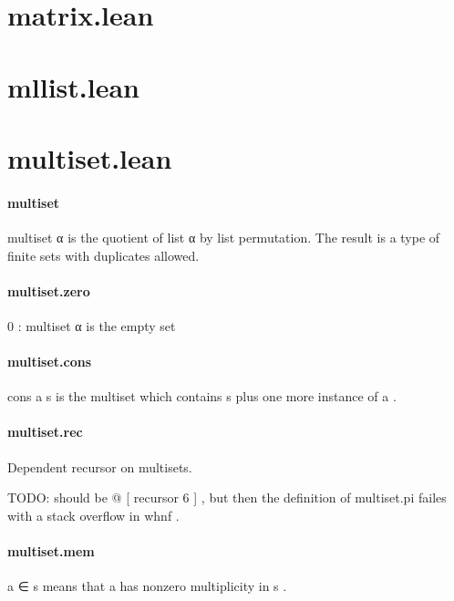 \documentclass{article}
\begin{document}
\section{matrix.lean}\section{mllist.lean}\section{multiset.lean}\paragraph{multiset}
\par
\colorbox[RGB]{253,246,227}{{{{\color[RGB]{101, 123, 131} multiset α }}}} is the quotient of 
\colorbox[RGB]{253,246,227}{{{{\color[RGB]{101, 123, 131} list α }}}} by list permutation. The result
is a type of finite sets with duplicates allowed.
\paragraph{multiset.zero}
\par
\colorbox[RGB]{253,246,227}{{{{\color[RGB]{108, 113, 196} 0 }}}{{{\color[RGB]{101, 123, 131}  : multiset α }}}} is the empty set
\paragraph{multiset.cons}
\par
\colorbox[RGB]{253,246,227}{{{{\color[RGB]{101, 123, 131} cons a s }}}} is the multiset which contains 
\colorbox[RGB]{253,246,227}{{{{\color[RGB]{101, 123, 131} s }}}} plus one more
instance of 
\colorbox[RGB]{253,246,227}{{{{\color[RGB]{101, 123, 131} a }}}}.
\paragraph{multiset.rec}
\par
Dependent recursor on multisets.
\par
TODO: should be @
{[}
recursor 6
{]}
, but then the definition of 
\colorbox[RGB]{253,246,227}{{{{\color[RGB]{101, 123, 131} multiset.pi }}}} failes with a stack
overflow in 
\colorbox[RGB]{253,246,227}{{{{\color[RGB]{101, 123, 131} whnf }}}}.
\paragraph{multiset.mem}
\par
\colorbox[RGB]{253,246,227}{{{{\color[RGB]{101, 123, 131} a ∈ s }}}} means that 
\colorbox[RGB]{253,246,227}{{{{\color[RGB]{101, 123, 131} a }}}} has nonzero multiplicity in 
\colorbox[RGB]{253,246,227}{{{{\color[RGB]{101, 123, 131} s }}}}.
\end{document}

